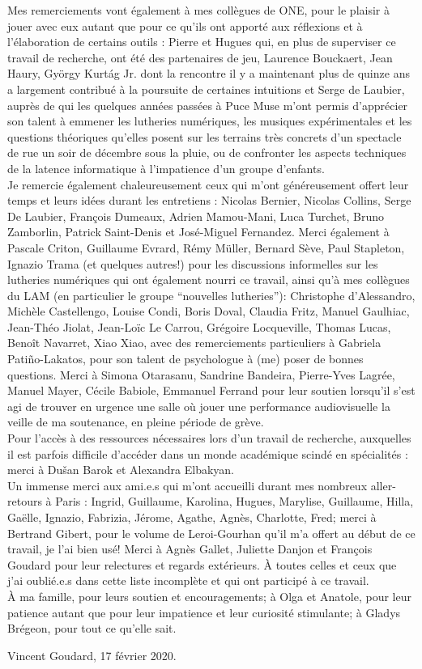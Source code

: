 \indent Mes remerciements vont également à mes collègues de ONE, pour le plaisir à jouer avec eux autant que pour ce qu'ils ont apporté aux réflexions et à l'élaboration de certains outils : Pierre et Hugues qui, en plus de superviser ce travail de recherche, ont été des partenaires de jeu, Laurence Bouckaert, Jean Haury, György Kurtág Jr. dont la rencontre il y a maintenant plus de quinze ans a largement contribué à la poursuite de certaines intuitions et Serge de Laubier, auprès de qui les quelques années passées à Puce Muse m'ont permis d'apprécier son talent à emmener les lutheries numériques, les musiques expérimentales et les questions théoriques qu'elles posent sur les terrains très concrets d'un spectacle de rue un soir de décembre sous la pluie, ou de confronter les aspects techniques de la latence informatique à l'impatience d'un groupe d'enfants.\\
\indent Je remercie également chaleureusement ceux qui m'ont généreusement offert leur temps et leurs idées durant les entretiens : Nicolas Bernier, Nicolas Collins, Serge De Laubier, François Dumeaux, Adrien Mamou-Mani, Luca Turchet, Bruno Zamborlin, Patrick Saint-Denis et José-Miguel Fernandez. Merci également à Pascale Criton, Guillaume Evrard, Rémy Müller, Bernard Sève, Paul Stapleton, Ignazio Trama (et quelques autres!) pour les discussions informelles sur les lutheries numériques qui ont également nourri ce travail, ainsi qu'à mes collègues du LAM (en particulier le groupe ``nouvelles lutheries''): Christophe d'Alessandro, Michèle Castellengo, Louise Condi, Boris Doval, Claudia Fritz, Manuel Gaulhiac, Jean-Théo Jiolat, Jean-Loïc Le Carrou, Grégoire Locqueville, Thomas Lucas, Benoît Navarret, Xiao Xiao, avec des remerciements particuliers à Gabriela Patiño-Lakatos, pour son talent de psychologue à (me) poser de bonnes questions. Merci à Simona Otarasanu, Sandrine Bandeira, Pierre-Yves Lagrée, Manuel Mayer, Cécile Babiole, Emmanuel Ferrand pour leur soutien lorsqu'il s'est agi de trouver en urgence une salle où jouer une performance audiovisuelle la veille de ma soutenance, en pleine période de grève.\\
\indent Pour l'accès à des ressources nécessaires lors d'un travail de recherche, auxquelles il est parfois difficile d'accéder dans un monde académique scindé en spécialités : merci à Dušan Barok et Alexandra Elbakyan.\\
\indent Un immense merci aux ami.e.s qui m'ont accueilli durant mes nombreux aller-retours à Paris : Ingrid, Guillaume, Karolina, Hugues, Marylise, Guillaume, Hilla, Gaëlle, Ignazio, Fabrizia, Jérome, Agathe, Agnès, Charlotte, Fred; merci à Bertrand Gibert, pour le volume de Leroi-Gourhan qu'il m'a offert au début de ce travail, je l'ai bien usé! Merci à Agnès Gallet, Juliette Danjon et François Goudard pour leur relectures et regards extérieurs. À toutes celles et ceux que j'ai oublié.e.s dans cette liste incomplète et qui ont participé à ce travail.\\
\indent À ma famille, pour leurs soutien et encouragements; à Olga et Anatole, pour leur patience autant que pour leur impatience et leur curiosité stimulante; à Gladys Brégeon, pour tout ce qu'elle sait.
\begin{flushright}
Vincent Goudard, 17 février 2020.
\end{flushright}